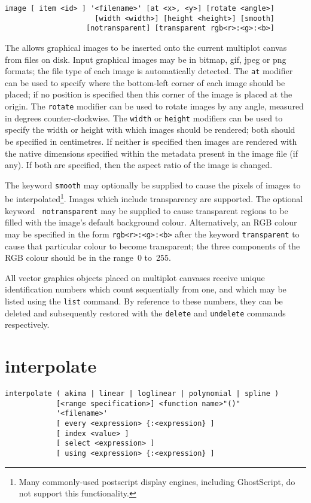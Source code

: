 \begin{verbatim}
image [ item <id> ] '<filename>' [at <x>, <y>] [rotate <angle>]
                     [width <width>] [height <height>] [smooth]
                   [notransparent] [transparent rgb<r>:<g>:<b>]
\end{verbatim}

The  allows graphical images to be inserted onto the current
multiplot canvas from files on disk. Input graphical images may be in bitmap,
gif, jpeg or png formats; the file type of each image is automatically
detected. The {\tt at} modifier can be used to specify where the bottom-left
corner of each image should be placed; if no position is specified then this
corner of the image is placed at the origin. The {\tt rotate} modifier can be
used to rotate images by any angle, measured in degrees counter-clockwise.  The
{\tt width} or {\tt height} modifiers can be used to specify the width or
height with which images should be rendered; both should be specified in
centimetres. If neither is specified then images are rendered with the native
dimensions specified within the metadata present in the image file (if any). If
both are specified, then the aspect ratio of the image is changed.

The keyword {\tt smooth} may optionally be supplied to cause the pixels of
images to be interpolated\footnote{Many commonly-used postscript display
engines, including GhostScript, do not support this functionality.}.  Images
which include transparency are supported. The optional keyword {\tt
notransparent} may be supplied to cause transparent regions to be filled with
the image's default background colour. Alternatively, an RGB colour may be
specified in the form {\tt rgb<r>:<g>:<b>} after the keyword {\tt transparent}
to cause that particular colour to become transparent; the three components of
the RGB colour should be in the range~0 to~255.

All vector graphics objects placed on multiplot canvases receive unique
identification numbers which count sequentially from one, and which may be
listed using the {\tt list} command.  By reference to these numbers, they can
be deleted and subsequently restored with the {\tt delete} and {\tt undelete}
commands respectively.


\section{interpolate}

\begin{verbatim}
interpolate ( akima | linear | loglinear | polynomial | spline )
            [<range specification>] <function name>"()"
            '<filename>'
            [ every <expression> {:<expression} ]
            [ index <value> ]
            [ select <expression> ]
            [ using <expression> {:<expression} ]
\end{verbatim}

